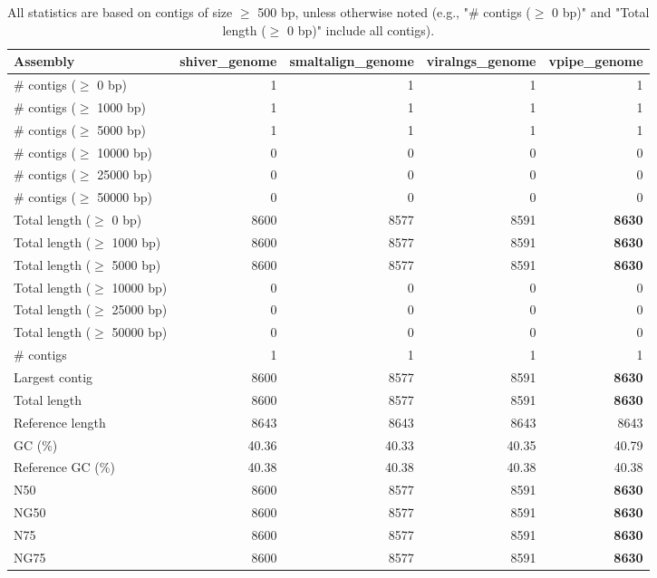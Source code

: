 \documentclass[12pt,a4paper]{article}
\begin{document}
\begin{table}[ht]
\begin{center}
\caption{All statistics are based on contigs of size $\geq$ 500 bp, unless otherwise noted (e.g., "\# contigs ($\geq$ 0 bp)" and "Total length ($\geq$ 0 bp)" include all contigs).}
\begin{tabular}{|l*{4}{|r}|}
\hline
Assembly & shiver\_genome & smaltalign\_genome & viralngs\_genome & vpipe\_genome \\ \hline
\# contigs ($\geq$ 0 bp) & 1 & 1 & 1 & 1 \\ \hline
\# contigs ($\geq$ 1000 bp) & 1 & 1 & 1 & 1 \\ \hline
\# contigs ($\geq$ 5000 bp) & 1 & 1 & 1 & 1 \\ \hline
\# contigs ($\geq$ 10000 bp) & 0 & 0 & 0 & 0 \\ \hline
\# contigs ($\geq$ 25000 bp) & 0 & 0 & 0 & 0 \\ \hline
\# contigs ($\geq$ 50000 bp) & 0 & 0 & 0 & 0 \\ \hline
Total length ($\geq$ 0 bp) & 8600 & 8577 & 8591 & {\bf 8630} \\ \hline
Total length ($\geq$ 1000 bp) & 8600 & 8577 & 8591 & {\bf 8630} \\ \hline
Total length ($\geq$ 5000 bp) & 8600 & 8577 & 8591 & {\bf 8630} \\ \hline
Total length ($\geq$ 10000 bp) & 0 & 0 & 0 & 0 \\ \hline
Total length ($\geq$ 25000 bp) & 0 & 0 & 0 & 0 \\ \hline
Total length ($\geq$ 50000 bp) & 0 & 0 & 0 & 0 \\ \hline
\# contigs & 1 & 1 & 1 & 1 \\ \hline
Largest contig & 8600 & 8577 & 8591 & {\bf 8630} \\ \hline
Total length & 8600 & 8577 & 8591 & {\bf 8630} \\ \hline
Reference length & 8643 & 8643 & 8643 & 8643 \\ \hline
GC (\%) & 40.36 & 40.33 & 40.35 & 40.79 \\ \hline
Reference GC (\%) & 40.38 & 40.38 & 40.38 & 40.38 \\ \hline
N50 & 8600 & 8577 & 8591 & {\bf 8630} \\ \hline
NG50 & 8600 & 8577 & 8591 & {\bf 8630} \\ \hline
N75 & 8600 & 8577 & 8591 & {\bf 8630} \\ \hline
NG75 & 8600 & 8577 & 8591 & {\bf 8630} \\ \hline

\end{tabular}
\end{center}
\end{table}
\end{document}
